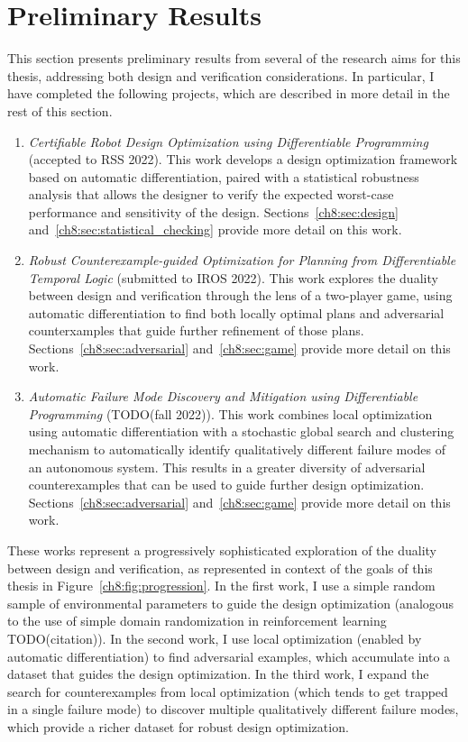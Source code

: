 
\section{Preliminary Results}

This section presents preliminary results from several of the research aims for this thesis, addressing both design and verification considerations. In particular, I have completed the following projects, which are described in more detail in the rest of this section.

\begin{enumerate}
    \item \textit{Certifiable Robot Design Optimization using Differentiable Programming} (accepted to RSS 2022). This work develops a design optimization framework based on automatic differentiation, paired with a statistical robustness analysis that allows the designer to verify the expected worst-case performance and sensitivity of the design. Sections~\ref{ch8:sec:design} and~\ref{ch8:sec:statistical_checking} provide more detail on this work.

    \item \textit{Robust Counterexample-guided Optimization for Planning from Differentiable Temporal Logic} (submitted to IROS 2022). This work explores the duality between design and verification through the lens of a two-player game, using automatic differentiation to find both locally optimal plans and adversarial counterxamples that guide further refinement of those plans. Sections~\ref{ch8:sec:adversarial} and~\ref{ch8:sec:game} provide more detail on this work.

    \item \textit{Automatic Failure Mode Discovery and Mitigation using Differentiable Programming} (TODO(fall 2022)). This work combines local optimization using automatic differentiation with a stochastic global search and clustering mechanism to automatically identify qualitatively different failure modes of an autonomous system. This results in a greater diversity of adversarial counterexamples that can be used to guide further design optimization. Sections~\ref{ch8:sec:adversarial} and~\ref{ch8:sec:game} provide more detail on this work.
\end{enumerate}

These works represent a progressively sophisticated exploration of the duality between design and verification, as represented in context of the goals of this thesis in Figure~\ref{ch8:fig:progression}. In the first work, I use a simple random sample of environmental parameters to guide the design optimization (analogous to the use of simple domain randomization in reinforcement learning TODO(citation)). In the second work, I use local optimization (enabled by automatic differentiation) to find adversarial examples, which accumulate into a dataset that guides the design optimization. In the third work, I expand the search for counterexamples from local optimization (which tends to get trapped in a single failure mode) to discover multiple qualitatively different failure modes, which provide a richer dataset for robust design optimization.

